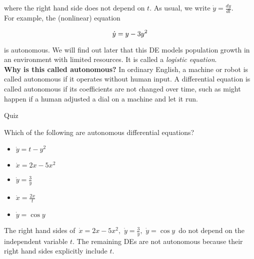 where the right hand side does not depend on $t$.
As usual, we write $\displaystyle \dot{y}=\frac{dy}{dt}$. \\

For example, the (nonlinear) equation

\begin{equation*}
  \displaystyle  \displaystyle \dot{y}=y-3y^2
\end{equation*}

is autonomous. We will find out later that this DE models population growth in an environment with limited resources. It is called a \textit{logistic equation}.\\

\textbf{Why is this called autonomous?} In ordinary English,
a machine or robot is called autonomous if it operates without human input.
A differential equation is called autonomous if its coefficients are not changed over time,
such as might happen if a human adjusted a dial on a machine and let it run.

\begin{exercise}
  Quiz
\end{exercise}

Which of the following are autonomous differential equations?

\begin{itemize}
\item $\dot{y}=t-y^2$
\item $\dot{x}=2x-5x^2$
\item $\displaystyle \dot{y}=\frac{3}{y}$
\item $\displaystyle \dot{x}=\frac{2x}{t}$
\item $\dot{y}=\cos y$
\end{itemize}

The right hand sides of $\, \dot{x}=2x-5x^2,\, \, \dot{y}=\frac{3}{y},\,\, \dot{y}=\cos y\,$
do not depend on the independent variable $t$.
The remaining DEs are not autonomous because their right hand sides explicitly include $t$.

